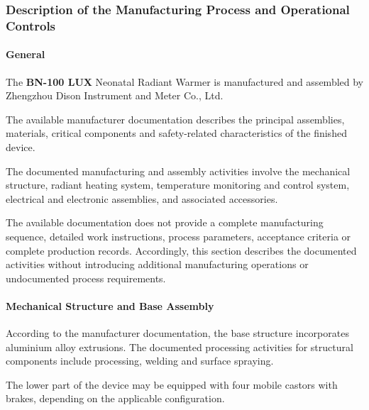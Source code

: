 ﻿

\hypertarget{p3-3-2-3}{}

\subsubsection{Description of the Manufacturing Process and Operational Controls}

\paragraph{General}

The \textbf{BN-100 LUX} Neonatal Radiant Warmer is manufactured and
assembled by Zhengzhou Dison Instrument and Meter Co., Ltd.

The available manufacturer documentation describes the principal
assemblies, materials, critical components and safety-related
characteristics of the finished device.

The documented manufacturing and assembly activities involve the
mechanical structure, radiant heating system, temperature monitoring
and control system, electrical and electronic assemblies, and
associated accessories.

The available documentation does not provide a complete
manufacturing sequence, detailed work instructions, process
parameters, acceptance criteria or complete production records.
Accordingly, this section describes the documented activities
without introducing additional manufacturing operations or
undocumented process requirements.


\paragraph{Mechanical Structure and Base Assembly}

According to the manufacturer documentation, the base structure
incorporates aluminium alloy extrusions. The documented processing
activities for structural components include processing, welding
and surface spraying.

The lower part of the device may be equipped with four mobile
castors with brakes, depending on the applicable configuration.

